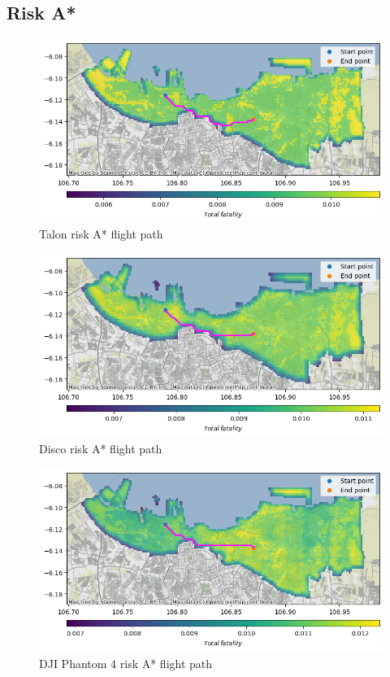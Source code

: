 \documentclass[12pt]{report}
\begin{document}
        \subsection{Risk A*}
        \begin{figure}[H]
            \centering
            \includegraphics[width=\textwidth]{Plot/talon/route with fatality.png}
            \caption{Talon risk A* flight path}
        \end{figure}
        \begin{figure}[H]
            \centering
            \includegraphics[width=\textwidth]{Plot/parrot/route with fatality.png}
            \caption{Disco risk A* flight path}
        \end{figure}
        \begin{figure}[H]
            \centering
            \includegraphics[width=\textwidth]{Plot/phantom4/risk with fatality.png}
            \caption{DJI Phantom 4 risk A* flight path}
        \end{figure}
\end{document}

